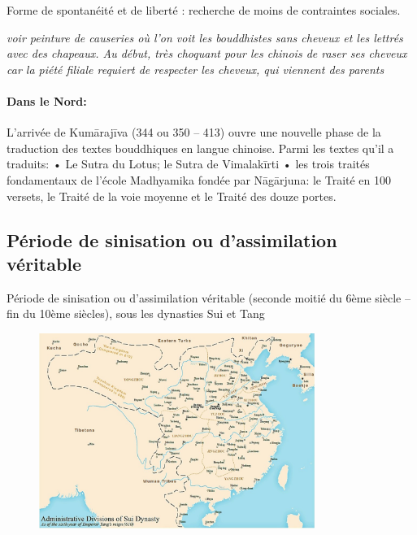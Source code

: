  Forme de spontanéité et de liberté : recherche de moins de contraintes sociales. 

\textit{voir peinture de causeries où l'on voit les bouddhistes sans cheveux et les lettrés avec des chapeaux. Au début, très choquant pour les chinois de raser ses cheveux car la piété filiale requiert de respecter les cheveux, qui viennent des parents}



 \paragraph{Dans le Nord:}


L’arrivée de Kumārajīva (344 ou 350 – 413) ouvre une nouvelle phase de la traduction des textes bouddhiques en langue chinoise.
Parmi les textes qu’il a traduits:
•	Le Sutra du Lotus; le Sutra de Vimalakīrti
•	les trois traités fondamentaux de l’école Madhyamika fondée par Nāgārjuna: le Traité en 100 versets, le Traité de la voie moyenne et le Traité des douze portes.

 \subsection{Période de sinisation ou d’assimilation véritable}

Période de sinisation ou d’assimilation véritable (seconde moitié du 6ème siècle – fin du 10ème siècles), sous les dynasties Sui et Tang
  



\begin{figure}[!h]
    \centering
    \includegraphics[width=0.8\textwidth]{ConfucianismeTaoismeBouddhismeChinois/Images/Sui.jpg}
 
    \label{fig:enter-label}
\end{figure} 



